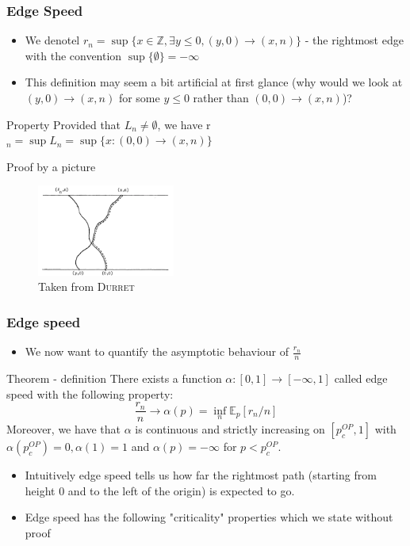 \begin{frame}
	\frametitle{Edge Speed}
	\begin{itemize}
		\item We denotel $r_{n} = \sup \{x \in \mathbb{Z}, \exists y \leq 0, (y, 0) \rightarrow (x, n)\}$ - the rightmost edge with the convention $\sup \{\emptyset\} = - \infty$
		\item This definition may seem a bit artificial at first glance (why would we look at $(y, 0) \rightarrow (x, n)$ for some $y \leq 0$ rather than $(0, 0) \rightarrow (x, n)$)?
	\end{itemize}
	\begin{block}{Property}
		Provided that $L_{n} \neq \emptyset$, we have r$_{n} = \sup L_{n} = \sup \{x: (0, 0) \rightarrow (x, n) \} $
	\end{block}
	\begin{block}{Proof by a picture}
		\begin{figure}
			\caption{Taken from \textsc{Durret}}
			\includegraphics[height = 3cm]{image_edge_speed}
			\centering
		\end{figure}
	\end{block}
\end{frame}

\begin{frame}
	\frametitle{Edge speed}
	\begin{itemize}
		\item We now want to quantify the asymptotic behaviour of $\frac{r_{n}}{n}$
	\end{itemize}
	\begin{block}{Theorem - definition}
		There exists a function $\alpha: [0, 1] \rightarrow [- \infty, 1]$ called edge speed with the following property:
		$$
			\frac{r_{n}}{n} \rightarrow \alpha (p) = \inf_{n} \mathbb{E}_{p}[r_{n}/n]
		$$
		Moreover, we have that $\alpha$ is continuous and strictly increasing on $[p_{c}^{OP}, 1]$ with $\alpha(p_{c}^{OP}) = 0, \alpha(1) = 1$ and $\alpha(p) = -\infty$ for $p < p_{c}^{OP}$.
	\end{block}
	\begin{itemize}
		\item Intuitively edge speed tells us how far the rightmost path (starting from height 0 and to the left of the origin) is expected to go.
		\item Edge speed has the following "criticality" properties which we state without proof
	\end{itemize}

\end{frame}

